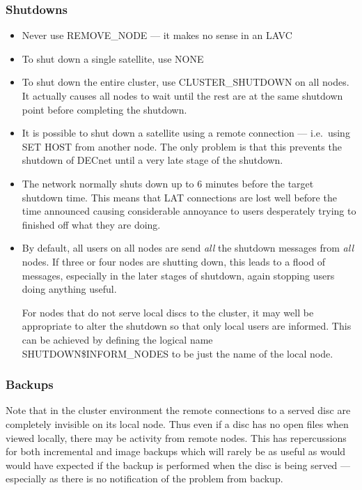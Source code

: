 \subsubsection {Shutdowns}
\begin {itemize}
\item Never use REMOVE\_NODE --- it makes no sense in an LAVC
\item To shut down a single satellite, use NONE
\item To shut down the entire cluster, use CLUSTER\_SHUTDOWN on all nodes.
It actually causes all nodes to wait until the rest are at the same shutdown
point before completing the shutdown.
\item It is possible to shut down a satellite using a remote connection ---
i.e.\ using SET HOST from another node.
The only problem is that this prevents the shutdown of DECnet until a very
late stage of the shutdown.
\item The network normally shuts down up to 6 minutes before the target
shutdown time.
This means that LAT connections are lost well before the time announced
causing considerable annoyance to users desperately trying to finished off
what they are doing.
\item By default, all users on all nodes are send {\em all} the shutdown
messages from {\em all} nodes.
If three or four nodes are shutting down, this leads to a flood of messages,
especially in the later stages of shutdown, again stopping users doing anything
useful.

For nodes that do not serve local discs to the cluster, it may well be 
appropriate to alter the shutdown so that only local users are informed.
This can be achieved by defining the logical name SHUTDOWN\$INFORM\_NODES
to be just the name of the local node.
\end {itemize}

\subsubsection {Backups}
Note that in the cluster environment the remote connections to a served
disc are completely invisible on its local node.
Thus even if a disc has no open files when viewed locally, there may be
activity from remote nodes.
This has repercussions for both incremental and image backups which will
rarely be as useful as would would have expected if the backup is performed
when the disc is being served --- especially as there is no notification
of the problem from backup.

